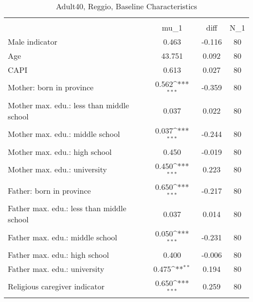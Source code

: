 \begin{table}[htbp]\centering
\def\sym#1{\ifmmode^{#1}\else\(^{#1}\)\fi}
\caption{Adult40, Reggio, Baseline Characteristics}
\begin{tabular}{l*{1}{ccc}}
\toprule
                    &\multicolumn{3}{c}{}                           \\
                    &        mu\_1         &        diff&         N\_1\\
\midrule
Male indicator      &       0.463         &      -0.116&          80\\
Age                 &      43.751         &       0.092&          80\\
CAPI                &       0.613         &       0.027&          80\\
Mother: born in province&       0.562\sym{***}&      -0.359&          80\\
Mother max. edu.: less than middle school&       0.037         &       0.022&          80\\
Mother max. edu.: middle school&       0.037\sym{***}&      -0.244&          80\\
Mother max. edu.: high school&       0.450         &      -0.019&          80\\
Mother max. edu.: university&       0.450\sym{***}&       0.223&          80\\
Father: born in province&       0.650\sym{***}&      -0.217&          80\\
Father max. edu.: less than middle school&       0.037         &       0.014&          80\\
Father max. edu.: middle school&       0.050\sym{***}&      -0.231&          80\\
Father max. edu.: high school&       0.400         &      -0.006&          80\\
Father max. edu.: university&       0.475\sym{**} &       0.194&          80\\
Religious caregiver indicator&       0.650\sym{***}&       0.259&          80\\
\bottomrule
\end{tabular}
\end{table}

